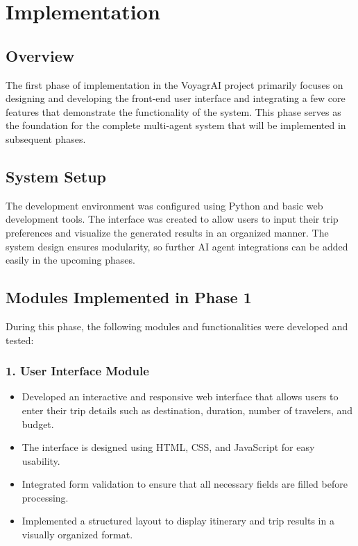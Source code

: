 \chapter{Implementation}

\section{Overview}
The first phase of implementation in the VoyagrAI project primarily focuses on designing and developing the front-end user interface and integrating a few core features that demonstrate the functionality of the system. This phase serves as the foundation for the complete multi-agent system that will be implemented in subsequent phases.

\section{System Setup}
The development environment was configured using Python and basic web development tools. The interface was created to allow users to input their trip preferences and visualize the generated results in an organized manner. The system design ensures modularity, so further AI agent integrations can be added easily in the upcoming phases.

\section{Modules Implemented in Phase 1}
During this phase, the following modules and functionalities were developed and tested:

\subsection{1. User Interface Module}
\begin{itemize}
  \item Developed an interactive and responsive web interface that allows users to enter their trip details such as destination, duration, number of travelers, and budget.
  \item The interface is designed using HTML, CSS, and JavaScript for easy usability.
  \item Integrated form validation to ensure that all necessary fields are filled before processing.
  \item Implemented a structured layout to display itinerary and trip results in a visually organized format.
\end{itemize}

